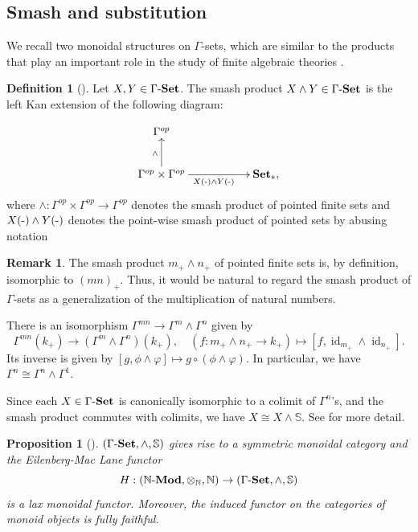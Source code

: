 \documentclass{article}
\numberwithin{equation}{section}
\newtheorem{prop}[thm]{Proposition}
\theoremstyle{definition}
\newtheorem{definition}[thm]{Definition}
\newtheorem{rem}[thm]{Remark}
\begin{document}
\subsection{Smash and substitution}
We recall two monoidal structures on $\Gamma$-sets, which are similar to the products that play an important role in the study of finite algebraic theories \cite{GF}.
\begin{definition}[\cite{Lydakis, CC}]Let $X, Y\in\Gamma \mathchar`-\mathbf{Set}$. 
The smash product $X\wedge Y\in\Gamma \mathchar`-\mathbf{Set}$ is the left Kan extension of the following diagram:


\[
\xymatrix{
\Gamma^{op}&&\\
\Gamma^{op}\times\Gamma^{op} \ar[u]^{\wedge} \ar[rr]_{X(\mathchar`-)\wedge Y(\mathchar`-)} &&\mathbf{Set}_*,
}\]
where $\wedge:\Gamma^{op}\times\Gamma^{op}\to\Gamma^{op}$ denotes the smash product of pointed finite sets and $X(\mathchar`-)\wedge Y(\mathchar`-)$ denotes the point-wise smash product of pointed sets by abusing notation 

\end{definition}



\begin{rem}The smash product $m_{+}\wedge n_{+}$ of pointed finite sets is, by definition, isomorphic to $(mn)_{+}$.
Thus, it would be natural to regard the smash product of $\Gamma$-sets as a generalization of the multiplication of natural numbers.

There is an isomorphism $\Gamma^{mn}\to\Gamma^{m}\wedge\Gamma^{n}$ given by
\[\Gamma^{mn}(k_+)\to(\Gamma^{m}\wedge\Gamma^{n})(k_+), \quad (f:m_{+}\wedge n_{+}\to k_+)\mapsto [f, \operatorname{id}_{m_+}\wedge\operatorname{id}_{n_+}].\]
Its inverse is given by $[g, \phi\wedge\varphi]\mapsto g\circ(\phi\wedge\varphi)$.
In particular, we have $\Gamma^{n}\cong\Gamma^{n}\wedge\Gamma^{1}$.

Since each $X\in\Gamma \mathchar`-\mathbf{Set}$ is canonically isomorphic to a colimit of $\Gamma^n$'s, and the smash product commutes with colimits, we have $X\cong X\wedge\mathbb{S}$.
See \cite{Lydakis} for more detail.
\end{rem}


\begin{prop}[\cite{CC}]
 $(\Gamma \mathchar`-\mathbf{Set}, \wedge, \mathbb{S})$ gives rise to a symmetric monoidal category and the Eilenberg-Mac Lane functor 
\[H:(\mathbb{N}\mathchar`-\mathbf{Mod}, \otimes_{\mathbb{N}}, \mathbb{N})\to(\Gamma \mathchar`-\mathbf{Set}, \wedge, \mathbb{S})\]
is a lax monoidal functor.
Moreover, the induced functor on the categories of monoid objects is fully faithful.
\end{prop}
\end{document}
